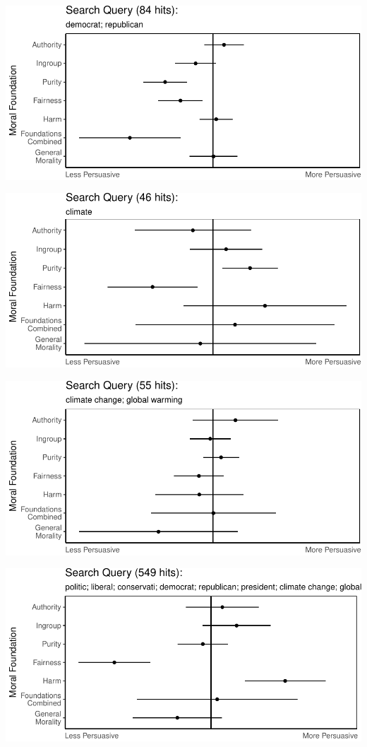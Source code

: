 \documentclass[11pt,]{article}
\begin{document}
\includegraphics{prelim_files/figure-latex/unnamed-chunk-18-1.pdf}

\includegraphics{prelim_files/figure-latex/unnamed-chunk-19-1.pdf}

\includegraphics{prelim_files/figure-latex/unnamed-chunk-20-1.pdf}

\includegraphics{prelim_files/figure-latex/unnamed-chunk-21-1.pdf}




\newpage
\singlespacing 

\end{document}
